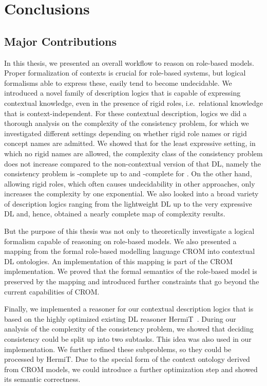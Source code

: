 \chapter{Conclusions}
\label{cha:conclusions}


\section{Major Contributions}
\label{sec:major-contributions}

In this thesis, we presented an overall workflow to reason on role-based models. Proper formalization
of contexts is crucial for role-based systems, but logical formalisms able to express these, easily
tend to become undecidable.  We introduced a novel family of description logics that is capable of
expressing contextual knowledge, even in the presence of rigid roles, i.e.\ relational knowledge
that is context-independent.  For these contextual description, logics we did a thorough analysis on
the complexity of the consistency problem, for which we investigated different settings depending on
whether rigid role names or rigid concept names are admitted. We showed that for the least
expressive setting, in which no rigid names are allowed, the complexity class of the consistency
problem does not increase compared to the non-contextual version of that DL, namely the consistency
problem is \ExpTime-complete up to \SHOQSHOQ and \NExpTime-complete for \SHOIQSHOIQ. On the other
hand, allowing rigid roles, which often causes undecidability in other approaches, only increases
the complexity by one exponential.
%
We also looked into a broad variety of description logics
ranging from the lightweight DL \EL up to the very expressive DL \SHOIQ and, hence, obtained a
nearly complete map of complexity results.

But the purpose of this thesis was not only to theoretically investigate a logical formalism capable
of reasoning on role-based models. We also presented a mapping from the formal role-based modelling
language CROM into contextual DL ontologies. An implementation of this mapping is part of the CROM
implementation. We proved that the formal semantics of the role-based model is preserved
by the mapping and introduced further constraints that go beyond the current capabilities of CROM.

Finally, we implemented a reasoner for our contextual description logics that is based on the highly
optimized existing DL reasoner HermiT~\cite{GHM-JAR14}.  During our analysis of the complexity of
the consistency problem, we showed that deciding consistency could be split up into two
subtasks. This idea was also used in our implementation.  We further refined these subproblems, so
they could be processed by HermiT.  Due to the special form of the context ontology derived from
CROM models, we could introduce a further optimization step and showed its semantic correctness.




